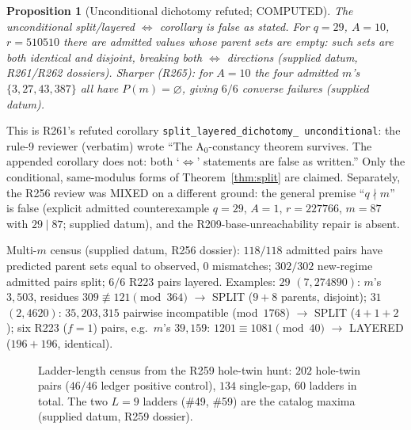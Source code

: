 \documentclass[11pt,a4paper]{article}
\newtheorem{proposition}{Proposition}
\theoremstyle{definition}
\begin{document}
\begin{proposition}[Unconditional dichotomy refuted; COMPUTED]
  \label{prop:uncond-false}
  The unconditional split/layered $\iff$ corollary is false as stated.
  For $q=29$, $A=10$, $r=510510$ there are admitted values whose parent
  sets are empty: such sets are both identical and disjoint, breaking
  both $\iff$ directions (supplied datum, R261/R262 dossiers). Sharper
  (R265): for $A=10$ the four admitted $m$'s $\{3,27,43,387\}$ all have
  $P(m)=\varnothing$, giving $6/6$ converse failures (supplied datum).
\end{proposition}

This is R261's refuted corollary \texttt{split\_layered\_dichotomy\_
unconditional}: the rule-9 reviewer (verbatim) wrote ``The A$_0$-constancy
theorem survives. The appended corollary does not: both `$\iff$'
statements are false as written.'' Only the conditional,
same-modulus forms of Theorem~\ref{thm:split} are claimed. Separately,
the R256 review was MIXED on a different ground: the general premise
``$q\nmid m$'' is false (explicit admitted counterexample $q=29$,
$A=1$, $r=227766$, $m=87$ with $29\mid87$; supplied datum), and the
R209-base-unreachability repair is absent.

Multi-$m$ census (supplied datum, R256 dossier): $118/118$ admitted
pairs have predicted parent sets equal to observed, $0$ mismatches;
$302/302$ new-regime admitted pairs split; $6/6$ R223 pairs layered.
Examples: $29$ $(7,274890)$: $m$'s $3,503$, residues
$309\not\equiv121\pmod{364}$ $\to$ SPLIT ($9+8$ parents, disjoint);
$31$ $(2,4620)$: $35,203,315$ pairwise incompatible (mod~$1768$)
$\to$ SPLIT ($4+1+2$); six R223 ($f=1$) pairs, e.g.\ $m$'s $39,159$:
$1201\equiv1081\pmod{40}$ $\to$ LAYERED ($196+196$, identical).

\begin{figure}[t]
  \centering
  \caption{Ladder-length census from the R259 hole-twin hunt: $202$
    hole-twin pairs ($46/46$ ledger positive control), $134$ single-gap,
    $60$ ladders in total. The two $L=9$ ladders (\#49, \#59) are the
    catalog maxima (supplied datum, R259 dossier).}
  \label{fig:ladderbars}
\end{figure}
\end{document}
